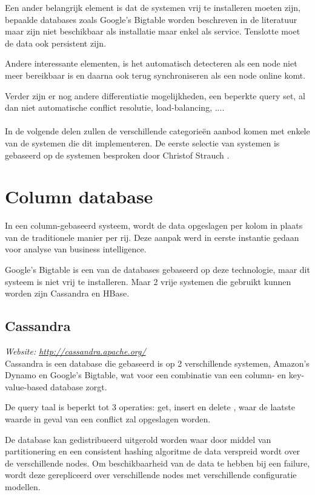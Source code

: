 Een ander belangrijk element is dat de systemen vrij te installeren moeten zijn, bepaalde databases zoals Google's Bigtable worden beschreven in de literatuur maar zijn niet beschikbaar als installatie maar enkel als service. Tenslotte moet de data ook persistent zijn. 

Andere interessante elementen, is het automatisch detecteren als een node niet meer bereikbaar is en daarna ook terug synchroniseren als een node online komt. 

Verder zijn er nog andere differentiatie mogelijkheden, een beperkte query set, al dan niet automatische conflict resolutie, load-balancing, ....  

\paragraph{} In de volgende delen zullen de verschillende categorieën aanbod komen met enkele van de systemen die dit implementeren. De eerste selectie van systemen is gebaseerd op de systemen besproken door Christof Strauch \cite{Strauch.NoSQL}.

\section{Column database}
In een column-gebaseerd systeem, wordt de data opgeslagen per kolom in plaats van de traditionele manier per rij. Deze aanpak werd in eerste instantie gedaan voor analyse van business intelligence. 

Google's Bigtable is een van de databases gebaseerd op deze technologie, maar dit systeem is niet vrij te installeren. Maar 2 vrije systemen die gebruikt kunnen worden zijn Cassandra en HBase. 


\subsection{Cassandra}
\textit{Website: \url{http://cassandra.apache.org/}}\\
Cassandra is een database die gebaseerd is op 2 verschillende systemen, Amazon's Dynamo en Google's Bigtable, wat voor een combinatie van een column- en key-value-based database zorgt. 

De query taal is beperkt tot 3 operaties: get, insert en delete \cite{Lakshman:2010:CDS:1773912.1773922}, waar de  laatste waarde in geval van een conflict zal opgeslagen worden.

De database kan gedistribueerd uitgerold worden waar door middel van partitionering en een consistent hashing algoritme de data verspreid wordt over de verschillende nodes. Om beschikbaarheid van de data te hebben bij een failure, wordt deze gerepliceerd over verschillende nodes met verschillende configuratie modellen. 

